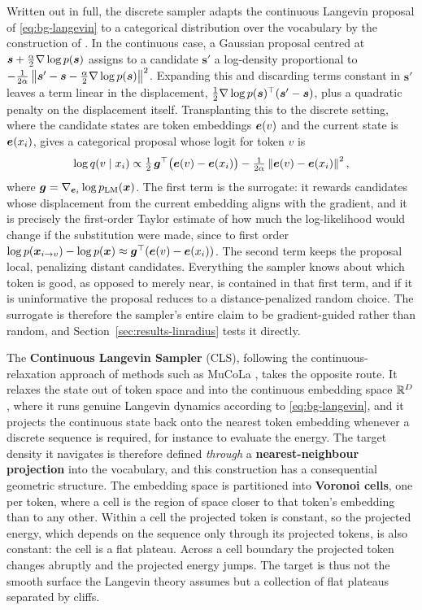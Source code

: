 Written out in full, the discrete sampler adapts the continuous Langevin proposal of \eqref{eq:bg-langevin} to a categorical distribution over the vocabulary by the construction of \citet{zhang2022langevin}. In the continuous case, a Gaussian proposal centred at $\bm{s} + \tfrac{\alpha}{2}\nabla\log p(\bm{s})$ assigns to a candidate $\bm{s}'$ a log-density proportional to $-\tfrac{1}{2\alpha}\left\lVert\bm{s}' - \bm{s} - \tfrac{\alpha}{2}\nabla\log p(\bm{s})\right\rVert^2$. Expanding this and discarding terms constant in $\bm{s}'$ leaves a term linear in the displacement, $\tfrac{1}{2}\nabla\log p(\bm{s})^\top(\bm{s}' - \bm{s})$, plus a quadratic penalty on the displacement itself. Transplanting this to the discrete setting, where the candidate states are token embeddings $\bm{e}(v)$ and the current state is $\bm{e}(x_i)$, gives a categorical proposal whose logit for token $v$ is
\begin{equation}
    \log q(v \mid x_i) \propto \tfrac{1}{2}\,\bm{g}^\top\bigl(\bm{e}(v) - \bm{e}(x_i)\bigr) - \tfrac{1}{2\alpha}\left\lVert\bm{e}(v) - \bm{e}(x_i)\right\rVert^2,
    \label{eq:bg-discrete-proposal}
\end{equation}
where $\bm{g} = \nabla_{\bm{e}_i}\log p_{\text{LM}}(\bm{x})$. The first term is the surrogate: it rewards candidates whose displacement from the current embedding aligns with the gradient, and it is precisely the first-order Taylor estimate of how much the log-likelihood would change if the substitution were made, since to first order $\log p(\bm{x}_{i \to v}) - \log p(\bm{x}) \approx \bm{g}^\top(\bm{e}(v) - \bm{e}(x_i))$. The second term keeps the proposal local, penalizing distant candidates. Everything the sampler knows about which token is good, as opposed to merely near, is contained in that first term, and if it is uninformative the proposal reduces to a distance-penalized random choice. The surrogate is therefore the sampler's entire claim to be gradient-guided rather than random, and Section~\ref{sec:results-linradius} tests it directly.

The \textbf{Continuous Langevin Sampler} (CLS), following the continuous-relaxation approach of methods such as MuCoLa \citep{kumar2022gradient}, takes the opposite route. It relaxes the state out of token space and into the continuous embedding space $\mathbb{R}^D$, where it runs genuine Langevin dynamics according to \eqref{eq:bg-langevin}, and it projects the continuous state back onto the nearest token embedding whenever a discrete sequence is required, for instance to evaluate the energy. The target density it navigates is therefore defined \emph{through} a \textbf{nearest-neighbour projection} into the vocabulary, and this construction has a consequential geometric structure. The embedding space is partitioned into \textbf{Voronoi cells}, one per token, where a cell is the region of space closer to that token's embedding than to any other. Within a cell the projected token is constant, so the projected energy, which depends on the sequence only through its projected tokens, is also constant: the cell is a flat plateau. Across a cell boundary the projected token changes abruptly and the projected energy jumps. The target is thus not the smooth surface the Langevin theory assumes but a collection of flat plateaus separated by cliffs.

